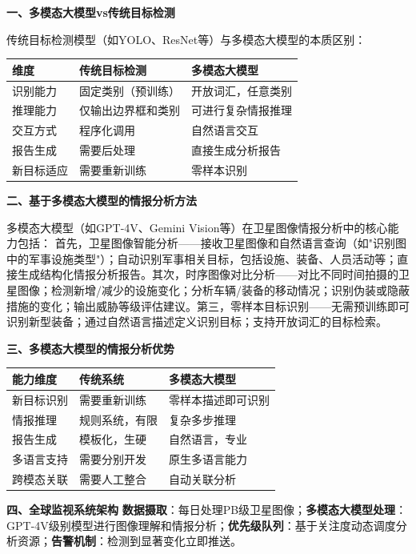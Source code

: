 \textbf{一、多模态大模型vs传统目标检测}

传统目标检测模型（如YOLO、ResNet等）与多模态大模型的本质区别：

\begin{table}[H]
\centering
\small
\begin{tabular}{p{3cm}p{4.5cm}p{4.5cm}}
\toprule
\textbf{维度} & \textbf{传统目标检测} & \textbf{多模态大模型} \\
\midrule
识别能力 & 固定类别（预训练） & 开放词汇，任意类别 \\
推理能力 & 仅输出边界框和类别 & 可进行复杂情报推理 \\
交互方式 & 程序化调用 & 自然语言交互 \\
报告生成 & 需要后处理 & 直接生成分析报告 \\
新目标适应 & 需要重新训练 & 零样本识别 \\
\bottomrule
\end{tabular}
\end{table}

\textbf{二、基于多模态大模型的情报分析方法}

多模态大模型（如GPT-4V、Gemini Vision等）在卫星图像情报分析中的核心能力包括：
首先，卫星图像智能分析——接收卫星图像和自然语言查询（如"识别图中的军事设施类型"）；自动识别军事相关目标，包括设施、装备、人员活动等；直接生成结构化情报分析报告。其次，时序图像对比分析——对比不同时间拍摄的卫星图像；检测新增/减少的设施变化；分析车辆/装备的移动情况；识别伪装或隐蔽措施的变化；输出威胁等级评估建议。第三，零样本目标识别——无需预训练即可识别新型装备；通过自然语言描述定义识别目标；支持开放词汇的目标检索。

\textbf{三、多模态大模型的情报分析优势}

\begin{center}
\begin{tabular}{p{3cm}p{4cm}p{4cm}}
\toprule
\textbf{能力维度} & \textbf{传统系统} & \textbf{多模态大模型} \\
\midrule
新目标识别 & 需要重新训练 & 零样本描述即可识别 \\
情报推理 & 规则系统，有限 & 复杂多步推理 \\
报告生成 & 模板化，生硬 & 自然语言，专业 \\
多语言支持 & 需要分别开发 & 原生多语言能力 \\
跨模态关联 & 需要人工整合 & 自动关联分析 \\
\bottomrule
\end{tabular}
\end{center}

\textbf{四、全球监视系统架构}
\textbf{数据摄取}：每日处理PB级卫星图像；\textbf{多模态大模型处理}：GPT-4V级别模型进行图像理解和情报分析；\textbf{优先级队列}：基于关注度动态调度分析资源；\textbf{告警机制}：检测到显著变化立即推送。

